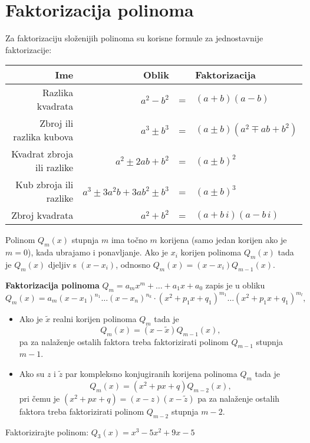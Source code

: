 \section{Faktorizacija polinoma}

Za faktorizaciju složenijih polinoma su korisne formule za jednostavnije
faktorizacije:

\begin{center}
    \begin{tabular}{r|rcl}
        Ime & Oblik && Faktorizacija \\
        \hline
        Razlika kvadrata & $a^2 - b^2$ &=& $(a+b)(a-b)$ \\
        Zbroj ili razlika kubova & $a^3 \pm b^3$ &=& $(a \pm b)(a^2 \mp ab + b^2)$ \\
        Kvadrat zbroja ili razlike & $a^2 \pm 2ab + b^2$ &=& $(a \pm b)^2$ \\
        Kub zbroja ili razlike & $a^3 \pm 3a^2b + 3ab^2 \pm b^3$ &=& $(a \pm b)^3$ \\
        \hline
        \hline
        Zbroj kvadrata & $a^2 + b^2$ &=& $(a+b\,i)(a-b\,i)$ \\
    \end{tabular}
\end{center}

\noindent
Polinom $Q_m(x)$ stupnja $m$ ima točno $m$ korijena (samo jedan korijen ako je
$m=0$), kada ubrajamo i ponavljanje. Ako je $x_i$ korijen polinoma $Q_m(x)$ tada
je $Q_m(x)$ djeljiv s $(x-x_i)$, odnosno $Q_m(x) = (x-x_i)Q_{m-1}(x)$.

\textbf{Faktorizacija polinoma} $Q_m=a_mx^m+\dots+a_1x+a_0$ zapis je u obliku
$$
Q_m(x) = a_m(x-x_1)^{n_1}\dots(x-x_n)^{n_k}\cdot(x^2+p_1x+q_1)^{m_1}\dots(x^2+p_1x+q_1)^{m_l},
$$

\begin{itemize}
    \item Ako je $\tilde{x}$ realni korijen polinoma $Q_m$ tada je
    $$
    Q_m(x) = (x-\tilde{x})Q_{m-1}(x),
    $$
    pa za nalaženje ostalih faktora treba faktorizirati polinom $Q_{m-1}$
    stupnja $m-1$.
    \item Ako su $z$ i $\tilde{z}$ par kompleksno konjugiranih korijena polinoma
    $Q_m$ tada je
    $$
    Q_m(x) = (x^2+px+q)Q_{m-2}(x),
    $$
    pri čemu je $(x^2+px+q) = (x-z)(x-\tilde{z})$ pa za nalaženje ostalih
    faktora treba faktorizirati polinom $Q_{m-2}$ stupnja $m-2$.
\end{itemize}

\begin{example}
    Faktorizirajte polinom:
    $Q_3(x) = x^3-5x^2+9x-5$
\end{example}

